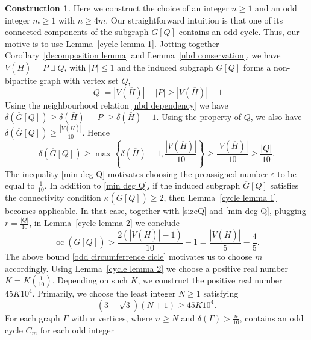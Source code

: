 \documentclass[reqno,10pt]{amsart}
\theoremstyle{definition}
\newtheorem{construction}[theorem]{Construction}
\begin{document}
\begin{construction}\label{construction}
Here we construct the choice of an integer $n\geq1$ and an odd integer $m\geq1$ with $n\geq4m$. Our straightforward intuition is that one of its connected components of the subgraph $\overline{G}[Q]$ contains an odd cycle. Thus, our motive is to use  Lemma~\ref{cycle lemma 1}.  Jotting together Corollary~\ref{decomposition lemma} and  Lemma~\ref{nbd conservation}, we have $V(\overline{H})=P\sqcup Q$, with $|P|\leq1$ and the induced subgraph  $\overline{G}[Q]$ forms a non-bipartite graph with vertex set $Q$,
\begin{equation}\label{sizeQ}
|Q|= |V(\overline{H})|-|P|\geq|V(\overline{H})|-1
\end{equation}
Using the neighbourhood relation \eqref{nbd dependency} we have $\delta(\overline{G}[Q])\geq\delta(\overline{H})-|P|\geq\delta(\overline{H})-1$. Using the property of $Q$, we also have $\delta(\overline{G}[Q])\geq\frac{|V(\overline{H})|}{10}$. Hence 
\begin{equation}\label{min deg Q}
\delta(\overline{G}[Q])\geq\max\left\{\delta(\overline{H})-1,\frac{|V(\overline{H})|}{10}\right\}\geq\frac{|V(\overline{H})|}{10}\geq\frac{|Q|}{10}.
\end{equation}
The inequality \eqref{min deg Q} motivates choosing the preassigned number $\varepsilon$ to be equal to $\frac{1}{10}$. In addition to \eqref{min deg Q}, if the induced subgraph $\overline{G}[Q]$ satisfies the connectivity condition $\kappa(\overline{G}[Q])\geq2$, then Lemma~\ref{cycle lemma 1} becomes applicable. In that case, together with \eqref{sizeQ} and  \eqref{min deg Q}, plugging $r=\frac{|Q|}{10}$, in Lemma~\ref{cycle lemma 2} we conclude
\begin{equation}\label{odd circumferrence cicle}
\mathop{oc}(\overline{G}[Q])> \frac{2(|V(\overline{H})|-1)}{10}-1=\frac{|V(\overline{H})|}{5}-\frac{4}{5}.
\end{equation} 
The above bound \eqref{odd circumferrence cicle} motivates us to choose $m$ accordingly. Using Lemma~\ref{cycle lemma 2} we choose a positive real number $K=K(\frac{1}{10})$. Depending on such $K$, we construct the positive real number $45K10^{4}$. Primarily, we choose the least integer $N\geq1$ satisfying
\begin{equation}\label{large integer construction}
(3-\sqrt{3})(N+1)\geq 45K10^{4}.
\end{equation}
For each graph $\Gamma$ with $n$ vertices, where $n\geq N$  and  $\delta(\Gamma)>\frac{n}{10}$, contains an odd cycle $C_{m}$ for each odd integer

\end{construction}
\end{document}
